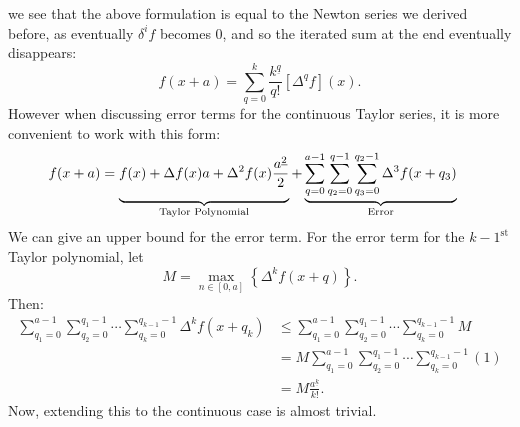 \documentclass{article}
\theoremstyle{definition}
\begin{document}
we see that the above formulation is equal to the Newton series we derived before, as eventually $\delta^if$ becomes 0, and so the iterated sum at the end eventually disappears:
\[f(x+a)=\sum_{q=0}^k\frac{k^{\underline{q}}}{q!}[\Delta^qf](x).\]
However when discussing error terms for the continuous Taylor series, it is more convenient to work with this form:
\begin{align*}
	f(x+a)&=\underbrace{\vphantom{\sum_{q=0}^{a-1}}f(x)+\Delta f(x)a+\Delta^2f(x)\frac{a^{\underline{2}}}{2}}_{\text{\normalfont Taylor Polynomial}}+\underbrace{\sum_{q=0}^{a-1}\sum_{q_2=0}^{q-1}\sum_{q_3=0}^{q_2-1}\Delta^3f(x+q_3)}_{\text{\normalfont Error}}
\end{align*}
We can give an upper bound for the error term. For the error term for the $k-1^\text{st}$ Taylor polynomial, let \[M=\max_{n\in[0,a]}\left\{\Delta^kf(x+q)\right\}.\] Then:
\begin{align*}
	\sum_{q_1=0}^{a-1}\sum_{q_2=0}^{q_1-1}\cdots\sum_{q_k=0}^{q_{k-1}-1}\Delta^kf(x+q_k)&\leq\sum_{q_1=0}^{a-1}\sum_{q_2=0}^{q_1-1}\cdots\sum_{q_k=0}^{q_{k-1}-1}M\\
	&=M\sum_{q_1=0}^{a-1}\sum_{q_2=0}^{q_1-1}\cdots\sum_{q_k=0}^{q_{k-1}-1}(1)\\
	&=M\frac{a^{\underline{k}}}{k!}.
\end{align*}
Now, extending this to the continuous case is almost trivial.
\end{document}
